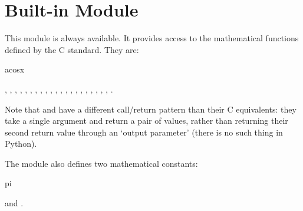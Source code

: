 \section{Built-in Module }

\renewcommand{\indexsubitem}{(in module math)}
This module is always available.
It provides access to the mathematical functions defined by the C
standard.
They are:
\iftexi
\begin{funcdesc}{acos}{x}
\end{funcdesc}
\else
{},
,
,
,
,
,
,
,
,
,
,
,
,
,
,
,
,
,
,
,
,
.
\fi

Note that  and  have a different call/return
pattern than their C equivalents: they take a single argument and
return a pair of values, rather than returning their second return
value through an `output parameter' (there is no such thing in Python).

The module also defines two mathematical constants:
\iftexi
\begin{datadesc}{pi}
\end{datadesc}
\else
{} and .
\fi
